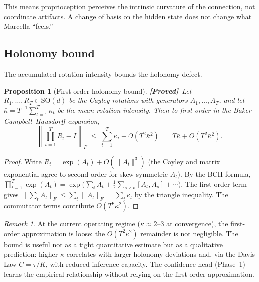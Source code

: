 \documentclass[11pt,a4paper]{article}
\newtheorem{proposition}[theorem]{Proposition}
\theoremstyle{definition}
\theoremstyle{remark}
\newtheorem{remark}[theorem]{Remark}
\newcommand{\SO}{\mathrm{SO}}
\newcommand{\statusproved}{\textcolor{green!50!black}{\textbf{[Proved]}}}
\begin{document}
This means proprioception perceives the intrinsic curvature of the 
connection, not coordinate artifacts. A change of basis on the hidden 
state does not change what Marcella ``feels.''

\subsection{Holonomy bound}\label{sec:proprio_holonomy}

The accumulated rotation intensity bounds the holonomy defect.

\begin{proposition}[First-order holonomy bound]
\label{prop:holonomy_bound}
\statusproved\ Let $R_1, \ldots, R_T \in \SO(d)$ be the Cayley 
rotations with generators $A_1, \ldots, A_T$, and let 
$\bar\kappa = T^{-1}\sum_{t=1}^T \kappa_t$ be the mean rotation 
intensity. Then to first order in the Baker--Campbell--Hausdorff 
expansion,
\begin{equation}\label{eq:holonomy_bound}
    \left\|\prod_{t=1}^{T} R_t - I\right\|_F 
    \;\leq\; \sum_{t=1}^{T} \kappa_t + O\!\left(T^2 \bar\kappa^2\right) 
    \;=\; T\bar\kappa + O\!\left(T^2 \bar\kappa^2\right).
\end{equation}
\end{proposition}

\begin{proof}
Write $R_t = \exp(A_t) + O(\|A_t\|^3)$ (the Cayley and matrix 
exponential agree to second order for skew-symmetric $A_t$). 
By the BCH formula, $\prod_{t=1}^T \exp(A_t) = 
\exp\!\bigl(\sum_t A_t + \tfrac{1}{2}\sum_{s < t}[A_t, A_s] + 
\cdots\bigr)$. The first-order term gives 
$\bigl\|\sum_t A_t\bigr\|_F \leq \sum_t \|A_t\|_F = \sum_t 
\kappa_t$ by the triangle inequality. The commutator terms 
contribute $O(T^2 \bar\kappa^2)$.
\end{proof}

\begin{remark}\label{rem:holonomy_caveat}
At the current operating regime ($\kappa \approx 2$--$3$ at 
convergence), the first-order approximation is loose: the 
$O(T^2\bar\kappa^2)$ remainder is not negligible. The bound is 
useful not as a tight quantitative estimate but as a qualitative 
prediction: higher $\kappa$ correlates with larger holonomy 
deviations and, via the Davis Law $C = \tau/K$, with reduced 
inference capacity. The confidence head (Phase~1) learns the 
empirical relationship without relying on the first-order 
approximation.
\end{remark}
\end{document}
